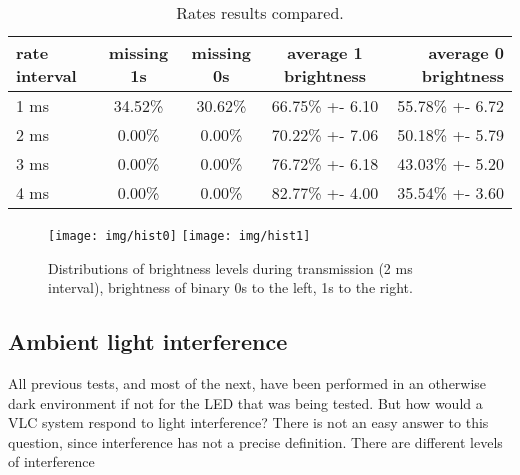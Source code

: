 \begin{table}[hbt]
\centering
 \begin{tabular}{l c c c r}
   rate interval & missing 1s & missing 0s & average 1 brightness & average 0 brightness \\
   \hline
   1 ms & 34.52\% & 30.62\% & 66.75\% +- 6.10 & 55.78\% +- 6.72 \\
   2 ms & 0.00\% & 0.00\% & 70.22\% +- 7.06 & 50.18\% +- 5.79 \\
   3 ms & 0.00\% & 0.00\% & 76.72\% +- 6.18 & 43.03\% +- 5.20 \\
   4 ms & 0.00\% & 0.00\% & 82.77\% +- 4.00 & 35.54\% +- 3.60 \\
   \hline
	\end{tabular}
  \caption{Rates results compared.}
  \label{ratestable}
\end{table}

\begin{figure}
\centering
\texttt{[image: img/hist0]}
\texttt{[image: img/hist1]}
\caption{Distributions of brightness levels during transmission (2 ms interval), brightness of binary 0s to the left, 1s to the right. }
\label{fig:histopeaks}
\end{figure}


\subsection{Ambient light interference}
All previous tests, and most of the next, have been performed in an otherwise dark environment if not for the LED that was being tested.
But how would a  VLC system respond to light interference?
There is not an easy answer to this question, since interference has not a precise definition.
There are different levels of interference
